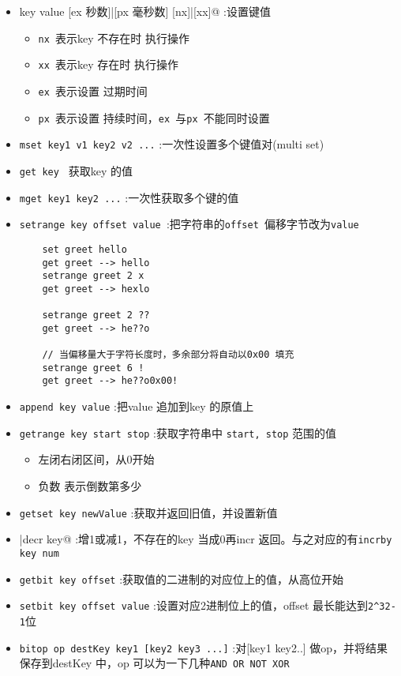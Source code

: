 \documentclass[UTF8,a4paper,12pt]{ctexbook}
\begin{document}
		\begin{itemize}[itemindent = 1em] 
			\item \verb@set key value [ex 秒数]|[px 毫秒数]  [nx]|[xx]@	:设置键值
				\begin{itemize}
					\item \verb|nx |表示key 不存在时 执行操作
					\item \verb|xx |表示key 存在时 执行操作
					\item \verb|ex |表示设置 过期时间
					\item \verb|px |表示设置 持续时间，\verb|ex |与\verb|px |不能同时设置
				\end{itemize}
			\item \verb|mset key1 v1 key2 v2 ...| :一次性设置多个键值对(multi set) 			
			\item \verb|get key | 获取key 的值
			\item \verb|mget key1 key2 ...| :一次性获取多个键的值
			\item \verb|setrange key offset value |:把字符串的\verb|offset |偏移字节改为\verb|value|
				\begin{lstlisting}
	set greet hello
	get greet --> hello
	setrange greet 2 x
	get greet --> hexlo
	
	setrange greet 2 ??
	get greet --> he??o
	
	// 当偏移量大于字符长度时，多余部分将自动以0x00 填充
	setrange greet 6 !
	get greet --> he??o0x00!
				\end{lstlisting}
			\item \verb|append key value| :把value 追加到key 的原值上
			\item \verb|getrange key start stop| :获取字符串中 \verb|start, stop| 范围的值
				\begin{itemize}
					\item 左闭右闭区间，从0开始
					\item 负数 表示倒数第多少
				\end{itemize}
			
			\item \verb|getset key newValue| :获取并返回旧值，并设置新值
			\item \verb@incr|decr key@ :增1或减1，不存在的key 当成0再incr 返回。与之对应的有\verb|incrby key num|
			\item \verb|getbit key offset| :获取值的二进制的对应位上的值，从高位开始
			\item \verb|setbit key offset value| :设置对应2进制位上的值，offset 最长能达到\verb|2^32-1|位
			\item \verb|bitop op destKey key1 [key2 key3 ...]| :对[key1 key2..] 做op，并将结果保存到destKey 中，op 可以为一下几种\verb|AND OR NOT XOR|
		\end{itemize}
				
\end{document}
